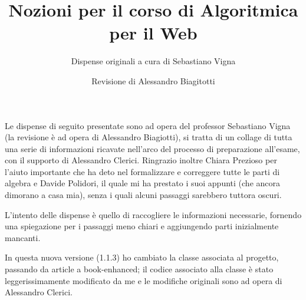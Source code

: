 \documentclass[a4paper]{book-enhanced}
\title{Nozioni per il corso di Algoritmica per il Web}
\subtitle{Dispense originali a cura di Sebastiano Vigna}
\author{Revisione di Alessandro Biagitotti}
\begin{document}
\maketitle
\noindent Le dispense di seguito presentate sono ad opera del professor Sebastiano Vigna (la
revisione è ad opera di Alessandro Biagiotti), si tratta di un collage di tutta una serie di
informazioni ricavate nell'arco del processo di preparazione all'esame, con il supporto di
Alessandro Clerici. Ringrazio inoltre Chiara Prezioso per l'aiuto importante che ha deto nel formalizzare e correggere tutte le parti di algebra e Davide Polidori, il quale mi ha prestato i suoi appunti (che ancora dimorano a casa mia), senza i quali alcuni passaggi sarebbero tuttora oscuri.

L'intento delle dispense è quello di raccogliere le informazioni necessarie, fornendo una spiegazione per i passaggi meno chiari e aggiungendo parti inizialmente mancanti.

In questa nuova versione (1.1.3) ho cambiato la classe associata al progetto, passando da article a book-enhanced; il codice associato alla classe è stato leggerissimamente modificato da me e le modifiche originali sono ad opera di Alessandro Clerici.

\tableofcontents
\clearpage



\end{document}
